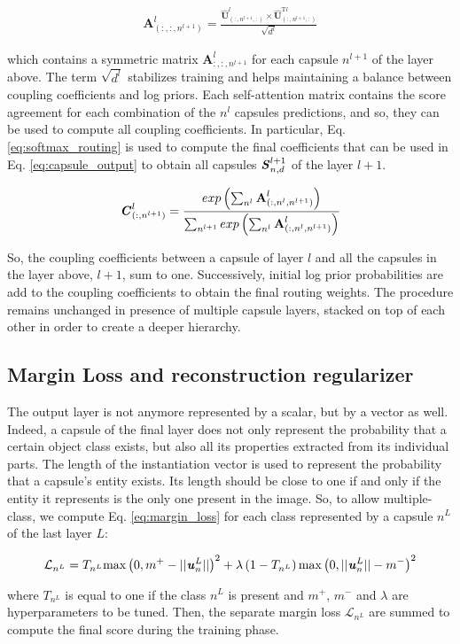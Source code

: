 \documentclass{article}
\begin{document}
\begin{ceqn}
\begin{gather}
    \textbf{A}^l_{(:,:,n^{l+1})} = \frac{\hat{\textbf{U}}_{(:,n^{l+1},:)}^{l} \times \hat{\textbf{U}}_{(:,n^{l+1},:)}^{\textrm{T}l}}{\sqrt{d^l}}
    \label{eq:self_attention}
\end{gather}
\end{ceqn}
which contains a symmetric matrix $\textbf{A}^l_{:,:,n^{l+1}}$ for each capsule $n^{l+1}$ of the layer above. The term $\sqrt{d^l}$ stabilizes training and helps maintaining a balance between coupling coefficients and log priors. Each self-attention matrix contains the score agreement for each combination of the $n^l$ capsules predictions, and so, they can be used to compute all coupling coefficients. In particular, Eq.\ref{eq:softmax_routing} is used to compute the final coefficients that can be used in Eq. \ref{eq:capsule_output} to obtain all capsules $\textbf{\textit{S}}^{l+1}_{n,d}$ of the layer $l+1$.
\begin{ceqn}
\begin{gather}
    \textbf{\textit{C}}^{l}_{(:,n^{l+1})} = \frac{exp\left(\sum_{n^l}\textbf{A}^l_{(:,n^l,n^{l+1})}\right)}{\sum_{n^{l+1}}exp\left(\sum_{n^l}\textbf{A}^l_{(:,n^l,n^{l+1})}\right)}
    \label{eq:softmax_routing}
\end{gather}
\end{ceqn}
So, the coupling coefficients between a capsule of layer $l$ and all the capsules in the layer above, $l+1$, sum to one. Successively, initial log prior probabilities are add to the coupling coefficients to obtain the final routing weights. The procedure remains unchanged in presence of multiple capsule layers, stacked on top of each other in order to create a deeper hierarchy. 
\subsection{Margin Loss and reconstruction regularizer}
The output layer is not anymore represented by a scalar, but by a vector as well. Indeed, a capsule of the final layer does not only represent the probability that a certain object class exists, but also all its properties extracted from its individual parts. The length of the instantiation vector is used to represent the probability that a capsule's entity exists. Its length should be close to one if and only if the entity it represents is the only one present in the image. So, to allow multiple-class, we compute Eq. \ref{eq:margin_loss} for each class represented by a capsule $n^L$ of the last layer $L$:
\begin{ceqn}
\begin{gather}
    \mathcal{L}_{n^L} = T_{n^L}\textrm{max}\left(0,m^{+} - ||\textbf{\textit{u}}^L_n||\right)^{2} + \lambda\left(1-T_{n^L}\right)\textrm{max}\left(0,||\textbf{\textit{u}}^L_n|| - m^{-}\right)^{2}
    \label{eq:margin_loss}
\end{gather}
\end{ceqn}
where $T_{n^L}$ is equal to one if the class $n^L$ is present and $m^{+}$, $m^{-}$ and $\lambda$ are hyperparameters to be tuned. Then, the separate margin loss $\mathcal{L}_{n^L}$ are summed to compute the final score during the training phase.
\end{document}
